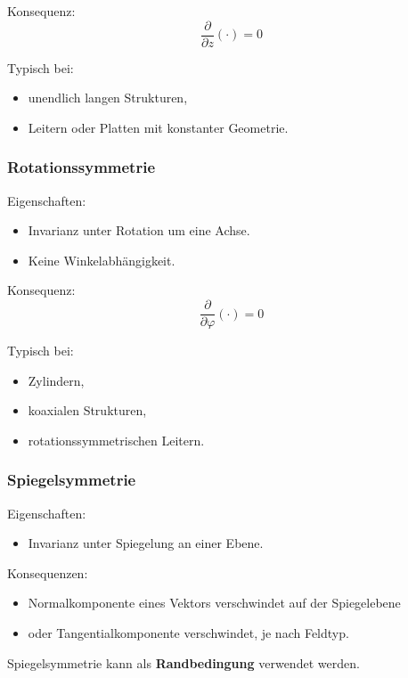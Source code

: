 \documentclass[a4paper]{article}
\newcommand{\imp}[1]{{\color{accent}\bfseries #1}}
\begin{document}
Konsequenz:
\[
\frac{\partial}{\partial z}(\cdot) = 0
\]

Typisch bei:
\begin{itemize}
  \item unendlich langen Strukturen,
  \item Leitern oder Platten mit konstanter Geometrie.
\end{itemize}

\subsubsection{Rotationssymmetrie}

Eigenschaften:
\begin{itemize}
  \item Invarianz unter Rotation um eine Achse.
  \item Keine Winkelabhängigkeit.
\end{itemize}

Konsequenz:
\[
\frac{\partial}{\partial \varphi}(\cdot) = 0
\]

Typisch bei:
\begin{itemize}
  \item Zylindern,
  \item koaxialen Strukturen,
  \item rotationssymmetrischen Leitern.
\end{itemize}

\subsubsection{Spiegelsymmetrie}

Eigenschaften:
\begin{itemize}
  \item Invarianz unter Spiegelung an einer Ebene.
\end{itemize}

Konsequenzen:
\begin{itemize}
  \item Normalkomponente eines Vektors verschwindet auf der Spiegelebene
  \item oder Tangentialkomponente verschwindet, je nach Feldtyp.
\end{itemize}

\begin{merke}
Spiegelsymmetrie kann als \imp{Randbedingung} verwendet werden.
\end{merke}
\end{document}
